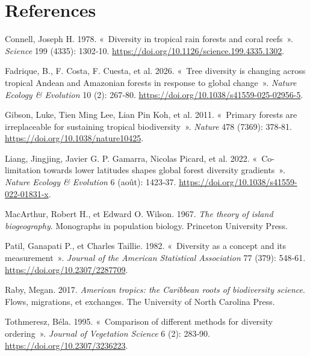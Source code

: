 \documentclass[
  french,
  11pt,
]{stylisharticle}
\newlength{\cslhangindent}
\newenvironment{CSLReferences}[2] %
 {\begin{list}{}{%
  \setlength{\itemindent}{0pt}
  \setlength{\leftmargin}{0pt}
  \setlength{\parsep}{0pt}
  \ifodd #1
   \setlength{\leftmargin}{\cslhangindent}
   \setlength{\itemindent}{-1\cslhangindent}
  \fi
  \setlength{\itemsep}{#2\baselineskip}}}
 {\end{list}}
\begin{document}
\section*{References}\label{bibliography}

\protect{}\label{refs}
\begin{CSLReferences}{1}{1}
Connell, Joseph H. 1978. {«~Diversity in tropical rain forests and coral
reefs~»}. \emph{Science} 199 (4335): 1302‑10.
\url{https://doi.org/10.1126/science.199.4335.1302}.

{Fadrique, B., F. Costa, F. Cuesta, et al.} 2026. {«~Tree diversity is
changing across tropical Andean and Amazonian forests in response to
global change~»}. \emph{Nature Ecology \& Evolution} 10 (2): 267‑80.
\url{https://doi.org/10.1038/s41559-025-02956-5}.

{Gibson, Luke, Tien Ming Lee, Lian Pin Koh, et al.} 2011. {«~Primary
forests are irreplaceable for sustaining tropical biodiversity~»}.
\emph{Nature} 478 (7369): 378‑81.
\url{https://doi.org/10.1038/nature10425}.

{Liang, Jingjing, Javier G. P. Gamarra, Nicolas Picard, et al.} 2022.
{«~Co-limitation towards lower latitudes shapes global forest diversity
gradients~»}. \emph{Nature Ecology \& Evolution} 6 (août): 1423‑37.
\url{https://doi.org/10.1038/s41559-022-01831-x}.

MacArthur, Robert H., et Edward O. Wilson. 1967. \emph{The theory of
island biogeography}. Monographs in population biology. Princeton
University Press.

Patil, Ganapati P., et Charles Taillie. 1982. {«~Diversity as a concept
and its measurement~»}. \emph{Journal of the American Statistical
Association} 77 (379): 548‑61. \url{https://doi.org/10.2307/2287709}.

Raby, Megan. 2017. \emph{American tropics: the Caribbean roots of
biodiversity science}. Flows, migrations, et exchanges. The University
of North Carolina Press.

Tothmeresz, Béla. 1995. {«~Comparison of different methods for diversity
ordering~»}. \emph{Journal of Vegetation Science} 6 (2): 283‑90.
\url{https://doi.org/10.2307/3236223}.

\end{CSLReferences}
\end{document}
